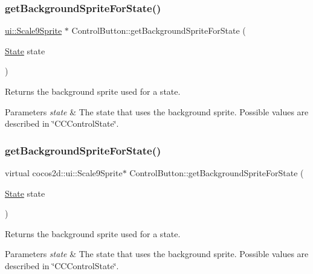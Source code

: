 \subsubsection{\texorpdfstring{get\+Background\+Sprite\+For\+State()}{getBackgroundSpriteForState()}\hspace{0.1cm}{\footnotesize\ttfamily [1/2]}}
{\footnotesize\ttfamily \hyperlink{classui_1_1Scale9Sprite}{ui\+::\+Scale9\+Sprite} $\ast$ Control\+Button\+::get\+Background\+Sprite\+For\+State (\begin{DoxyParamCaption}\item[{\hyperlink{classControl_a89e9598cd785841ac91cff3c4798c469}{State}}]{state }\end{DoxyParamCaption})\hspace{0.3cm}{\ttfamily [virtual]}}

Returns the background sprite used for a state.


\begin{DoxyParams}{Parameters}
{\em state} & The state that uses the background sprite. Possible values are described in \char`\"{}\+C\+C\+Control\+State\char`\"{}. \\
\hline
\end{DoxyParams}
\mbox{\label{classControlButton_ade0370ec919695bcd844b9c94e1697be}} 
\subsubsection{\texorpdfstring{get\+Background\+Sprite\+For\+State()}{getBackgroundSpriteForState()}\hspace{0.1cm}{\footnotesize\ttfamily [2/2]}}
{\footnotesize\ttfamily virtual cocos2d\+::ui\+::\+Scale9\+Sprite$\ast$ Control\+Button\+::get\+Background\+Sprite\+For\+State (\begin{DoxyParamCaption}\item[{\hyperlink{classControl_a89e9598cd785841ac91cff3c4798c469}{State}}]{state }\end{DoxyParamCaption})\hspace{0.3cm}{\ttfamily [virtual]}}

Returns the background sprite used for a state.


\begin{DoxyParams}{Parameters}
{\em state} & The state that uses the background sprite. Possible values are described in \char`\"{}\+C\+C\+Control\+State\char`\"{}. \\
\hline
\end{DoxyParams}
\mbox{\label{classControlButton_a27b739c0c1948c3a175e95e8eeb58d49}} 
